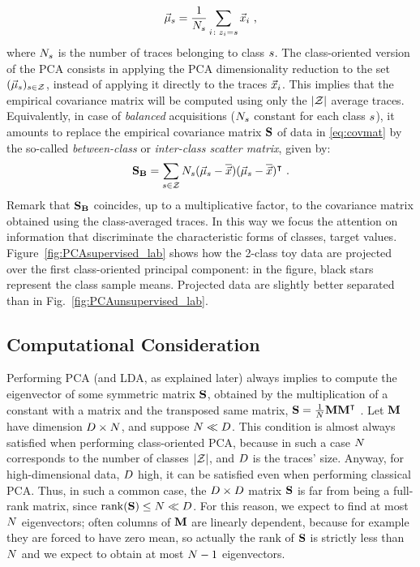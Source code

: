 \begin{equation*}
\vec{\mu}_{s} = \frac{1}{N_{s}}\sum_{i\colon z_i=s} \vec{x}_i \mbox{ ,}
\end{equation*}
where  $N_{s}$ is the number of traces belonging to class $s$. The class-oriented version of the PCA  consists in applying the PCA dimensionality reduction to the set $(\vec{\mu}_{s})_{s \in \mathcal{Z}}$, instead of applying it directly to the traces $\vec{x}_i$. This implies that the empirical covariance matrix will be computed using only the $\lvert\mathcal{Z}\rvert$ average traces. Equivalently, in case of \textit{balanced} acquisitions ($N_{s}$ constant for each class $s$), it amounts to replace the empirical covariance matrix $\textbf{S}$ of data in \eqref{eq:covmat}  by the so-called {\em between-class} or  {\em inter-class scatter matrix}, given by:
\begin{equation}\label{eq:SB}
\textbf{S}_{\textbf{B}} = \sum_{s\in\mathcal{Z}}N_{s}(\vec{\mu}_{s}-\overline{\vec{x}})(\vec{\mu}_{s}-\overline{\vec{x}})^\intercal \mbox{ .}
\end{equation}
Remark that $\textbf{S}_{\textbf{B}}$ coincides, up to a multiplicative factor, to the covariance matrix obtained using the class-averaged traces. In this way we focus the attention on information that discriminate the characteristic forms of classes, \ie target values. Figure~\ref{fig:PCAsupervised_lab} shows how the 2-class toy data are projected over the first class-oriented principal component: in the figure, black stars represent the class sample means. Projected data are slightly better separated than in Fig.~\ref{fig:PCAunsupervised_lab}.



\subsection{Computational Consideration}\label{sec:trick}
Performing PCA (and LDA, as explained later) always implies to compute the eigenvector of some symmetric matrix $\textbf{S}$, obtained by the multiplication of a constant with a matrix and the transposed same matrix, \eg $\textbf{S} = \frac{1}{N}\textbf{M}\textbf{M}^\intercal$ . Let $\textbf{M}$ have dimension $D\times N$, and suppose $N\ll D$. This condition is almost always satisfied when performing class-oriented PCA, because in such a case $N$ corresponds to the number of classes $\lvert\mathcal{Z}\rvert$, and $D$ is the traces' size. Anyway, for high-dimensional data, \ie $D$ high, it can be satisfied even when performing classical PCA. Thus, in such a common case, the $D\times D$ matrix $\textbf{S}$ is far from being a full-rank matrix, since $\mathrm{rank}(\textbf{S})\leq N\ll D$. For this reason, we expect to find at most $N$ eigenvectors; often columns of $\textbf{M}$ are linearly dependent, because for example they are forced to have zero mean, so actually the rank of $\textbf{S}$ is strictly less than $N$ and we expect to obtain at most $N-1$ eigenvectors.

